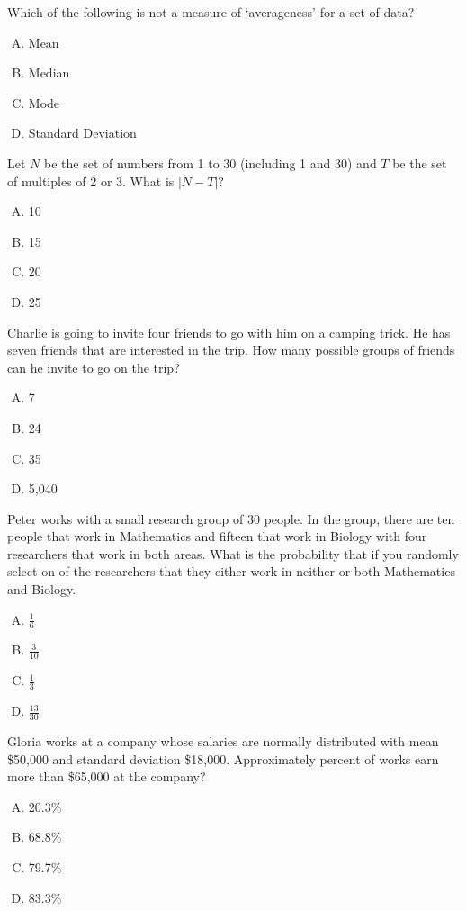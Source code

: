 \documentclass[12pt,letterpaper]{exam}
\begin{document}
\begin{questions}
\vfill

\question Which of the following is not a measure of `averageness' for a set of data?
	\begin{enumerate}[A.]
	\item Mean
	\item Median
	\item Mode
	\item Standard Deviation
	\end{enumerate}

\vfill

\question Let $N$ be the set of numbers from 1 to 30 (including 1 and 30) and $T$ be the set of multiples of 2 or 3. What is $|N - T|$?
	\begin{enumerate}[A.]
	\item 10
	\item 15
	\item 20
	\item 25
	\end{enumerate}

\vfill

\question Charlie is going to invite four friends to go with him on a camping trick. He has seven friends that are interested in the trip. How many possible groups of friends can he invite to go on the trip?
	\begin{enumerate}[A.]
	\item 7
	\item 24
	\item 35
	\item 5,040
	\end{enumerate}

\vfill

\question Peter works with a small research group of 30 people. In the group, there are ten people that work in Mathematics and fifteen that work in Biology with four researchers that work in both areas. What is the probability that if you randomly select on of the researchers that they either work in neither or both Mathematics and Biology.
	\begin{enumerate}[A.]
	\item $\frac{1}{6}$
	\item $\frac{3}{10}$
	\item $\frac{1}{3}$
	\item $\frac{13}{30}$
	\end{enumerate}

\vfill

\question Gloria works at a company whose salaries are normally distributed with mean \$50,000 and standard deviation \$18,000. Approximately percent of works earn more than \$65,000 at the company?
	\begin{enumerate}[A.]
	\item 20.3\%
	\item 68.8\%
	\item 79.7\%
	\item 83.3\%
	\end{enumerate}


\end{questions}
\end{document}
